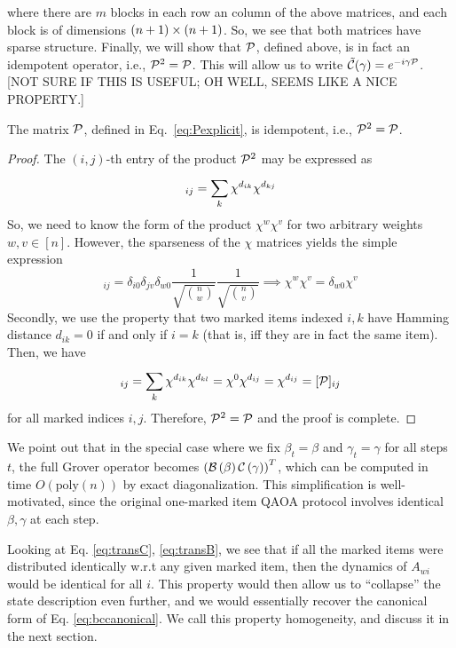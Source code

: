 \documentclass[11pt]{article}
\begin{document}
where there are $m$ blocks in each row an column of the above matrices, and each block is of dimensions $\left(n+1\right)\times\left(n+1\right)$. So, we see that both matrices have sparse structure. Finally, we will show that $\mathcal{P}$, defined above, is in fact an idempotent operator, i.e., $\mathcal{P}^2 = \mathcal{P}$. This will allow us to write $\tilde{\mathcal{C}}(\gamma) = e^{-i\gamma \mathcal{P}}$. [NOT SURE IF THIS IS USEFUL; OH WELL, SEEMS LIKE A NICE PROPERTY.]

\begin{lemma} 
  The matrix $\mathcal{P}$, defined in Eq.~\ref{eq:Pexplicit}, is idempotent, i.e., $\mathcal{P}^2 = \mathcal{P}$.
\end{lemma}
\begin{proof}
 The $(i,j)$-th entry of the product $\mathcal{P}^2$ may be expressed as
 \begin{equation}
   [\mc{P}^2]_{ij} = \suml{k}{}{\chi^{d_{ik}}\chi^{d_{kj}}}
 \end{equation}
 So, we need to know the form of the product $\chi^{w}\chi^{v}$ for two arbitrary weights $w,v\in [n]$. However, the sparseness of the $\chi$ matrices yields the simple expression
 \begin{equation}
   [\chi^{w}\chi^{v}]_{ij} = \delta_{i0}\delta_{jv}\delta_{w0}\frac{1}{\sqrt{\binom n w}}\frac{1}{\sqrt{\binom n v}} \implies \chi^{w}\chi^{v} = \delta_{w0}\chi^{v}
 \end{equation}
Secondly, we use the property that two marked items indexed $i,k$ have Hamming distance $d_{ik}=0$ if and only if $i=k$ (that is, iff they are in fact the same item). Then, we have
 \begin{equation}
   [\mc{P}^2]_{ij} = \suml{k}{}{\chi^{d_{ik}}\chi^{d_{kl}}} = \chi^{0}\chi^{d_{ij}} = \chi^{d_{ij}} = [\mc{P}]_{ij}
 \end{equation}
for all marked indices $i,j$. Therefore, $\mathcal{P}^2 = \mathcal{P}$ and the proof is complete.   
\end{proof}

We point out that in the special case where we fix $\beta_t = \beta$ and $\gamma_t = \gamma$ for all steps $t$, the full Grover operator becomes $\left(\mathcal{B}\left(\beta\right)\mathcal{C}\left(\gamma\right)\right)^T$, which can be computed in time $O(\text{poly}(n))$ by exact diagonalization. This simplification is well-motivated, since the original one-marked item QAOA protocol involves identical $\beta, \gamma$ at each step. 

Looking at Eq. \ref{eq:transC}, \ref{eq:transB}, we see that if all the marked items were distributed identically w.r.t any given marked item, then the dynamics of $A_{wi}$ would be identical for all $i$. This property would then allow us to ``collapse'' the state description even further, and we would essentially recover the canonical form of Eq. \ref{eq:bccanonical}. We call this property homogeneity, and discuss it in the next section.
\end{document}
